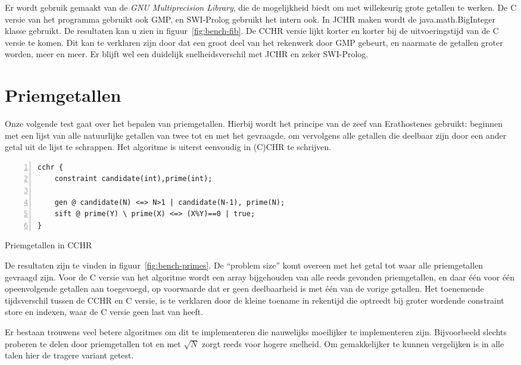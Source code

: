 Er wordt gebruik gemaakt van de {\em GNU Multiprecision Library}, die de mogelijkheid biedt om met willekeurig grote getallen te werken. De C versie van het programma gebruikt ook GMP, en SWI-Prolog gebruikt het intern ook. In JCHR maken wordt de java.math.BigInteger klasse gebruikt. De resultaten kan u zien in figuur~\ref{fig:bench-fib}. De CCHR versie lijkt korter en korter bij de uitvoeringstijd van de C versie te komen. Dit kan te verklaren zijn door dat een groot deel van het rekenwerk door GMP gebeurt, en naarmate de getallen groter worden, meer en meer. Er blijft wel een duidelijk snelheidsverschil met JCHR en zeker SWI-Prolog.

\section{Priemgetallen} \label{sec:bench-primes}

Onze volgende test gaat over het bepalen van priemgetallen. Hierbij wordt het principe van de zeef van Erathostenes gebruikt: beginnen met een lijst van alle natuurlijke getallen van twee tot en met het gevraagde, om vervolgens alle getallen die deelbaar zijn door een ander getal uit de lijst te schrappen. Het algoritme is uiterst eenvoudig in (C)CHR te schrijven.
\begin{exCode}
\begin{Verbatim}[frame=single,numbers=left]
cchr {
    constraint candidate(int),prime(int);

    gen @ candidate(N) <=> N>1 | candidate(N-1), prime(N);
    sift @ prime(Y) \ prime(X) <=> (X%Y)==0 | true;
}
\end{Verbatim}
\caption{\label{code:primes} Priemgetallen in CCHR}
\end{exCode}
De resultaten zijn te vinden in figuur~\ref{fig:bench-primes}. De ``problem size'' komt overeen met het getal tot waar alle priemgetallen gevraagd zijn. Voor de C versie van het algoritme wordt een array bijgehouden van alle reeds gevonden priemgetallen, en daar \'e\'en voor \'e\'en opeenvolgende getallen aan toegevoegd, op voorwaarde dat er geen deelbaarheid is met \'e\'en van de vorige getallen. Het toenemende tijdsverschil tussen de CCHR en C versie, is te verklaren door de kleine toename in rekentijd die optreedt bij groter wordende constraint store en indexen, waar de C versie geen last van heeft.

Er bestaan trouwens veel betere algoritmes om dit te implementeren die nauwelijks moeilijker te implementeren zijn. Bijvoorbeeld slechts proberen te delen door priemgetallen tot en met $\sqrt{N}$ zorgt reeds voor hogere snelheid. Om gemakkelijker te kunnen vergelijken is in alle talen hier de tragere variant getest.

